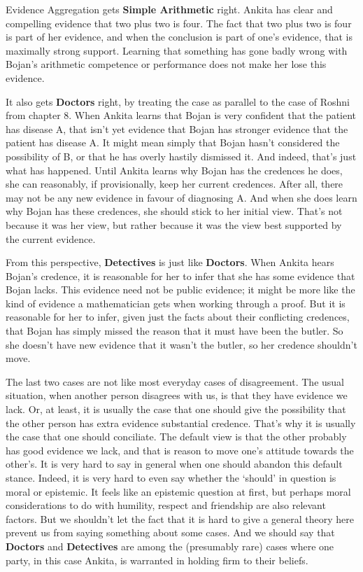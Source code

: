 \documentclass[
  10pt,
  letterpaper,
  twoside]{scrbook}
\begin{document}
Evidence Aggregation gets \textbf{Simple Arithmetic} right. {Ankita} has
clear and compelling evidence that two plus two is four. The fact that
two plus two is four is part of her evidence, and when the conclusion is
part of one's evidence, that is maximally strong support. Learning that
something has gone badly wrong with {Bojan}'s arithmetic competence or
performance does not make her lose this evidence.

It also gets \textbf{Doctors} right, by treating the case as parallel to
the case of {Roshni} from chapter 8. When {Ankita} learns that {Bojan}
is very confident that the patient has disease A, that isn't yet
evidence that {Bojan} has stronger evidence that the patient has disease
A. It might mean simply that {Bojan} hasn't considered the possibility
of B, or that he has overly hastily dismissed it. And indeed, that's
just what has happened. Until {Ankita} learns why {Bojan} has the
credences he does, she can reasonably, if provisionally, keep her
current credences. After all, there may not be any new evidence in
favour of diagnosing A. And when she does learn why {Bojan} has these
credences, she should stick to her initial view. That's not because it
was her view, but rather because it was the view best supported by the
current evidence.

From this perspective, \textbf{Detectives} is just like
\textbf{Doctors}. When {Ankita} hears {Bojan}'s credence, it is
reasonable for her to infer that she has some evidence that {Bojan}
lacks. This evidence need not be public evidence; it might be more like
the kind of evidence a mathematician gets when working through a proof.
But it is reasonable for her to infer, given just the facts about their
conflicting credences, that {Bojan} has simply missed the reason that it
must have been the butler. So she doesn't have new evidence that it
wasn't the butler, so her credence shouldn't move.

The last two cases are not like most everyday cases of disagreement. The
usual situation, when another person disagrees with us, is that they
have evidence we lack. Or, at least, it is usually the case that one
should give the possibility that the other person has extra evidence
substantial credence. That's why it is usually the case that one should
conciliate. The default view is that the other probably has good
evidence we lack, and that is reason to move one's attitude towards the
other's. It is very hard to say in general when one should abandon this
default stance. Indeed, it is very hard to even say whether the `should'
in question is moral or epistemic. It feels like an epistemic question
at first, but perhaps moral considerations to do with humility, respect
and friendship are also relevant factors. But we shouldn't let the fact
that it is hard to give a general theory here prevent us from saying
something about some cases. And we should say that \textbf{Doctors} and
\textbf{Detectives} are among the (presumably rare) cases where one
party, in this case {Ankita}, is warranted in holding firm to their
beliefs.
\end{document}
